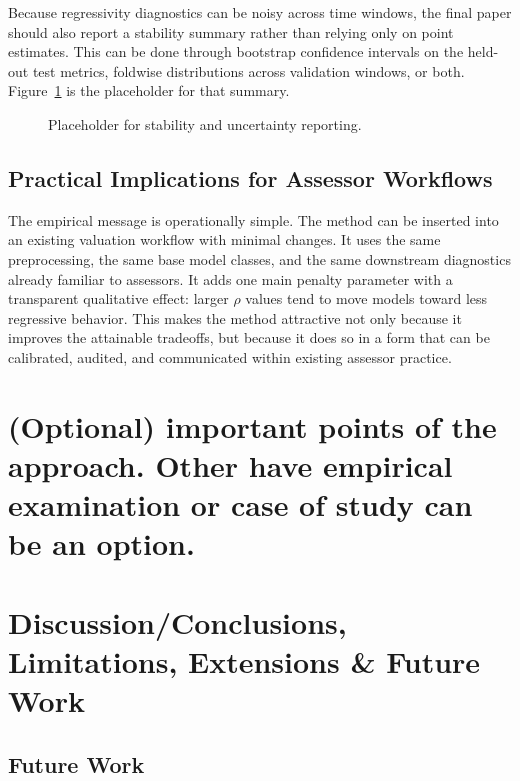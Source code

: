 \documentclass[12pt, draft]{article}
\theoremstyle{plain}
\theoremstyle{definition}
\newcommand{\1}{\mathbf{1}}
\begin{document}
Because regressivity diagnostics can be noisy across time windows, the final paper should also report a stability summary rather than relying only on point estimates. This can be done through bootstrap confidence intervals on the held-out test metrics, foldwise distributions across validation windows, or both. Figure~\ref{fig:stability_placeholder} is the placeholder for that summary.

\begin{figure}[t]
\centering
{}
\caption{Placeholder for stability and uncertainty reporting.}
\label{fig:stability_placeholder}
\end{figure}

\subsection{Practical Implications for Assessor Workflows}

The empirical message is operationally simple. The method can be inserted into an existing valuation workflow with minimal changes. It uses the same preprocessing, the same base model classes, and the same downstream diagnostics already familiar to assessors. It adds one main penalty parameter with a transparent qualitative effect: larger \(\rho\) values tend to move models toward less regressive behavior. This makes the method attractive not only because it improves the attainable tradeoffs, but because it does so in a form that can be calibrated, audited, and communicated within existing assessor practice.

\section{(Optional) important points of the approach. Other have empirical examination or case of study can be an option.}

\section{Discussion/Conclusions, Limitations, Extensions \& Future Work}

\subsection{Future Work}
\end{document}
